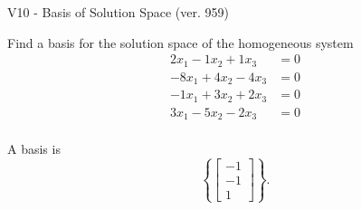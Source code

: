 \begin{exercise}
  \begin{exerciseTitle}V10 - Basis of Solution Space (ver. 959)\end{exerciseTitle}
  \begin{exerciseStatement}
    Find a basis for the solution space of the homogeneous system 
\begin{align*}
 2 x_ 1 -1 x_ 2 + 1 x_ 3 &= 0  \\ 
  -8 x_ 1 + 4 x_ 2 -4 x_ 3 &= 0  \\ 
  -1 x_ 1 + 3 x_ 2 + 2 x_ 3 &= 0  \\ 
  3 x_ 1 -5 x_ 2 -2 x_ 3 &= 0  \\ 
 \end{align*}


 
  \end{exerciseStatement}

  \begin{exerciseAnswer}
   A basis is   
\[\left\{\left[\begin{array}{c}
-1 \\
-1 \\
1
\end{array}\right]\right\}.\]

  


  \end{exerciseAnswer}
\end{exercise}
